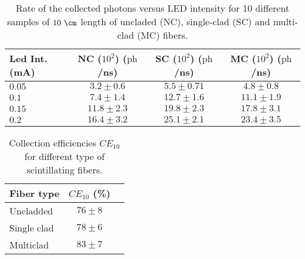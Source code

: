\begin{table}[htbp]
\centering{}%
\begin{tabular}{lccc}
\toprule 
Led Int. (mA) & NC ($10^{2}$) ($\text{ph}$/ns) & SC ($10^{2}$) ($\text{ph}$/ns) & MC ($10^{2}$) ($\text{ph}$/ns) \tabularnewline
\midrule
\midrule 
$0.05$ & $3.2 \pm 0.6$ & $5.5 \pm 0.71$ & $4.8 \pm 0.8$ \tabularnewline
$0.1$ & $7.4 \pm 1.4$ & $12.7 \pm 1.6$ & $11.1 \pm 1.9$ \tabularnewline
$0.15$ & $11.8 \pm 2.3$ & $19.8 \pm 2.3$ & $17.8\pm 3.1$ \tabularnewline
$0.2$ & $16.4 \pm 3.2$ & $25.1 \pm 2.1$ & $23.4 \pm 3.5$ \tabularnewline
\bottomrule
\end{tabular}
\caption{Rate of the collected photons versus LED intensity for 10 different samples of $10~\cm$ length of uncladed (NC), single-clad (SC) and multi-clad (MC) fibers.}
\label{tab:10DifferentSamplesAlltypes}
\end{table}



\begin{table}[htbp]
\centering{}%
\begin{tabular}{lcc}
\toprule 
Fiber type & $CE_{10}$ (\%) \tabularnewline
\midrule
\midrule 
Uncladded & $76 \pm 8$ \tabularnewline
Single clad & $78 \pm 6$ \tabularnewline
Multiclad & $83 \pm 7$ \tabularnewline
\bottomrule
\end{tabular}
\caption{Collection efficiencies $CE_{10}$ for different type of scintillating fibers.}
\label{tab:CollectionEfficiencyOfFibers}
\end{table}



